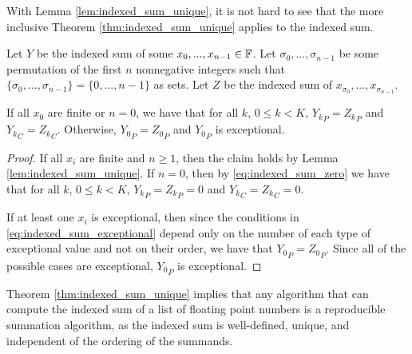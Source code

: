       With Lemma \ref{lem:indexed_sum_unique}, it is not hard to see that the more inclusive Theorem \ref{thm:indexed_sum_unique} applies to the indexed sum.

      \begin{samepage}
      \begin{thm}
        Let $Y$ be the indexed sum of some $x_0, ..., x_{n - 1} \in \mathbb{F}$.
        Let $\sigma_0, ..., \sigma_{n - 1}$ be some permutation of the first $n$ nonnegative integers such that $\{\sigma_0, ..., \sigma_{n - 1}\} = \{0, ..., n - 1\}$ as sets.
        Let $Z$ be the indexed sum of $x_{\sigma_0}, ..., x_{\sigma_{n - 1}}$.

        If all $x_0$ are finite or $n = 0$, we have that for all $k$, $0 \leq k < K$, ${Y_k}_P = {Z_k}_P$ and ${Y_k}_C = {Z_k}_C$. Otherwise, ${Y_0}_P = {Z_0}_P$ and ${Y_0}_P$ is exceptional.
        \label{thm:indexed_sum_unique}
      \end{thm}
      \end{samepage}
      \begin{proof}
        If all $x_i$ are finite and $n \geq 1$, then the claim holds by Lemma \ref{lem:indexed_sum_unique}. If $n = 0$, then by \eqref{eq:indexed_sum_zero} we have that
for all $k$, $0 \leq k < K$, ${Y_k}_P = {Z_k}_P = 0$ and ${Y_k}_C = {Z_k}_C = 0$.

        If at least one $x_i$ is exceptional, then since the conditions in \eqref{eq:indexed_sum_exceptional} depend only on the number of each type of exceptional value and not on their order, we have that ${Y_0}_P = {Z_0}_P$. Since all of the possible cases are exceptional, ${Y_0}_P$ is exceptional.
      \end{proof}

    Theorem \ref{thm:indexed_sum_unique} implies that any algorithm that can compute the indexed sum of a list of floating point numbers is a reproducible summation algorithm, as the indexed sum is well-defined, unique, and independent of the ordering of the summands.
